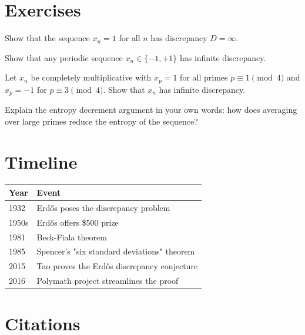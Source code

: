 \section{Exercises}

\begin{exercise}[Basic]
Show that the sequence $x_n = 1$ for all $n$ has discrepancy $D = \infty$.
\end{exercise}

\begin{exercise}[Basic]
Show that any periodic sequence $x_n \in \{-1, +1\}$ has infinite discrepancy.
\end{exercise}

\begin{exercise}[Intermediate]
Let $x_n$ be completely multiplicative with $x_p = 1$ for all primes $p \equiv 1 \pmod{4}$ and $x_p = -1$ for $p \equiv 3 \pmod{4}$. Show that $x_n$ has infinite discrepancy.
\end{exercise}

\begin{exercise}[Challenge]
Explain the entropy decrement argument in your own words: how does averaging over large primes reduce the entropy of the sequence?
\end{exercise}

\section{Timeline}

\begin{tabularx}{\linewidth}{lX}
\toprule
\textbf{Year} & \textbf{Event} \\ \midrule
1932 & Erdős poses the discrepancy problem \\ 
1950s & Erdős offers \$500 prize \\ 
1981 & Beck-Fiala theorem \\ 
1985 & Spencer's "six standard deviations" theorem \\ 
2015 & Tao proves the Erdős discrepancy conjecture \\ 
2016 & Polymath project streamlines the proof \\ \bottomrule
\end{tabularx}

\section{Citations}


